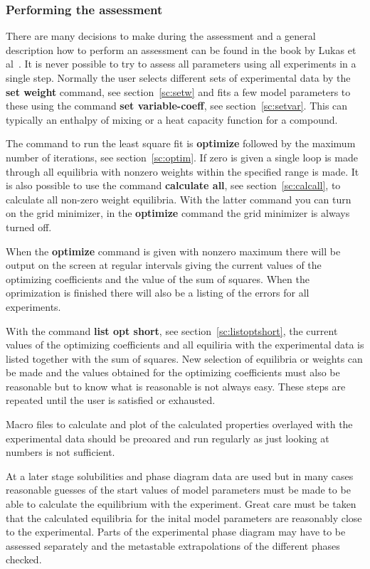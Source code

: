 \documentclass[11pt]{article}
\begin{document}
\subsubsection{Performing the assessment}\label{sc:assess}

There are many decisions to make during the assessment and a general
description how to perform an assessment can be found in the book by
Lukas et al~\cite{07Luk}.  It is never possible to try to assess all
parameters using all experiments in a single step.  Normally the user
selects different sets of experimental data by the {\bf set weight}
command, see section~\ref{sc:setw} and fits a few model parameters to
these using the command {\bf set variable-coeff}, see
section~\ref{sc:setvar}.  This can typically an enthalpy of mixing or
a heat capacity function for a compound.

The command to run the least square fit is {\bf optimize} followed by
the maximum number of iterations, see section~\ref{sc:optim}.  If zero
is given a single loop is made through all equilibria with nonzero
weights within the specified range is made.  It is also possible to
use the command {\bf calculate all}, see section~\ref{sc:calcall}, to
calculate all non-zero weight equilibria.  With the latter command you
can turn on the grid minimizer, in the {\bf optimize} command the grid
minimizer is always turned off.

When the {\bf optimize} command is given with nonzero maximum there
will be output on the screen at regular intervals giving the current
values of the optimizing coefficients and the value of the sum of
squares.  When the oprimization is finished there will also be a
listing of the errors for all experiments.

With the command {\bf list opt short}, see
section~\ref{sc:listoptshort}, the current values of the optimizing
coefficients and all equiliria with the experimental data is listed
together with the sum of squares.  New selection of equilibria or
weights can be made and the values obtained for the optimizing
coefficients must also be reasonable but to know what is reasonable is
not always easy.  These steps are repeated until the user is satisfied
or exhausted.

Macro files to calculate and plot of the calculated properties
overlayed with the experimental data should be preoared and run
regularly as just looking at numbers is not sufficient.

At a later stage solubilities and phase diagram data are used but in
many cases reasonable guesses of the start values of model parameters
must be made to be able to calculate the equilibrium with the
experiment.  Great care must be taken that the calculated equilibria
for the inital model parameters are reasonably close to the
experimental.  Parts of the experimental phase diagram may have to be
assessed separately and the metastable extrapolations of the different
phases checked.
\end{document}
